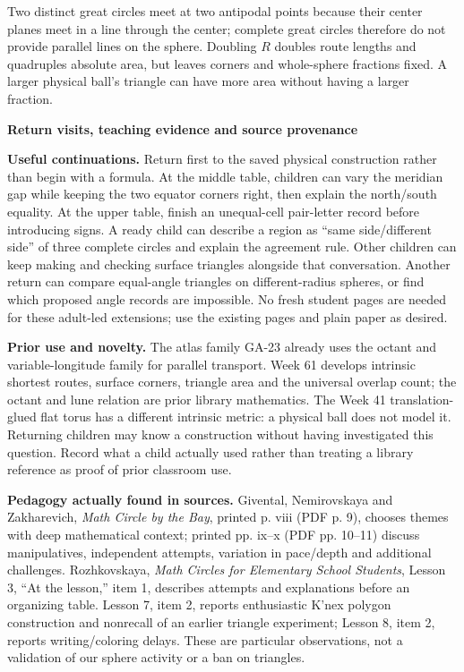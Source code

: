 \documentclass[11pt,letterpaper]{article}
\newcommand{\topic}[1]{\par{\large\bfseries\color{blue}#1}\par}
\begin{document}
Two distinct great circles meet at two antipodal points because their center planes meet in a line through the center; complete great circles therefore do not provide parallel lines on the sphere. Doubling $R$ doubles route lengths and quadruples absolute area, but leaves corners and whole-sphere fractions fixed. A larger physical ball's triangle can have more area without having a larger fraction.

\newpage
\topic{Return visits, teaching evidence and source provenance}
\textbf{Useful continuations.} Return first to the saved physical construction rather than begin with a formula. At the middle table, children can vary the meridian gap while keeping the two equator corners right, then explain the north/south equality. At the upper table, finish an unequal-cell pair-letter record before introducing signs. A ready child can describe a region as ``same side/different side'' of three complete circles and explain the agreement rule. Other children can keep making and checking surface triangles alongside that conversation. Another return can compare equal-angle triangles on different-radius spheres, or find which proposed angle records are impossible. No fresh student pages are needed for these adult-led extensions; use the existing pages and plain paper as desired.

\textbf{Prior use and novelty.} The atlas family GA-23 already uses the octant and variable-longitude family for parallel transport. Week 61 develops intrinsic shortest routes, surface corners, triangle area and the universal overlap count; the octant and lune relation are prior library mathematics. The Week 41 translation-glued flat torus has a different intrinsic metric: a physical ball does not model it. Returning children may know a construction without having investigated this question. Record what a child actually used rather than treating a library reference as proof of prior classroom use.

\textbf{Pedagogy actually found in sources.} Givental, Nemirovskaya and Zakharevich, \emph{Math Circle by the Bay}, printed p. viii (PDF p. 9), chooses themes with deep mathematical context; printed pp. ix--x (PDF pp. 10--11) discuss manipulatives, independent attempts, variation in pace/depth and additional challenges. Rozhkovskaya, \emph{Math Circles for Elementary School Students}, Lesson 3, ``At the lesson,'' item 1, describes attempts and explanations before an organizing table. Lesson 7, item 2, reports enthusiastic K'nex polygon construction and nonrecall of an earlier triangle experiment; Lesson 8, item 2, reports writing/coloring delays. These are particular observations, not a validation of our sphere activity or a ban on triangles.
\end{document}
